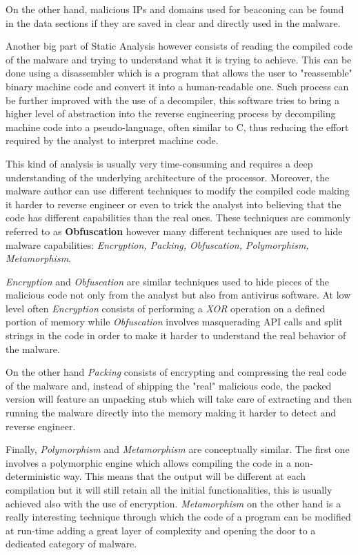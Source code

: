  On the other hand, malicious IPs and domains used for beaconing can be found in the data sections if they are saved in clear and directly used in the malware.  

Another big part of Static Analysis however consists of reading the compiled code of the malware and trying to understand what it is trying to achieve. This can be done using a disassembler which is a program that allows the user to "reassemble" binary machine code and convert it into a human-readable one. Such process can be further improved with the use of a decompiler, this software tries to bring a higher level of abstraction into the reverse engineering process by decompiling machine code into a pseudo-language, often similar to C, thus reducing the effort required by the analyst to interpret machine code.

This kind of analysis is usually very time-consuming and requires a deep understanding of the underlying architecture of the processor. Moreover, the malware author can use different techniques to modify the compiled code making it harder to reverse engineer or even to trick the analyst into believing that the code has different capabilities than the real ones. These techniques are commonly referred to as \textbf{Obfuscation} however many different techniques are used to hide malware capabilities: \textit{Encryption, Packing, Obfuscation, Polymorphism, Metamorphism}.\cite{Ye2017ASO}

\textit{Encryption} and \textit{Obfuscation} are similar techniques used to hide pieces of the malicious code not only from the analyst but also from antivirus software. At low level often \textit{Encryption} consists of performing a \textit{XOR} operation on a defined portion of memory while \textit{Obfuscation} involves masquerading API calls and split strings in the code in order to make it harder to understand the real behavior of the malware.

On the other hand \textit{Packing} consists of encrypting and compressing the real code of the malware and, instead of shipping the "real" malicious code, the packed version will feature an unpacking stub which will take care of extracting and then running the malware directly into the memory making it harder to detect and reverse engineer.

Finally, \textit{Polymorphism} and \textit{Metamorphism} are conceptually similar. The first one involves a polymorphic engine which allows compiling the code in a non-deterministic way. This means that the output will be different at each compilation but it will still retain all the initial functionalities, this is usually achieved also with the use of encryption. \textit{Metamorphism} on the other hand is a really interesting technique through which the code of a program can be modified at run-time adding a great layer of complexity and opening the door to a dedicated category of malware.


